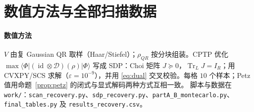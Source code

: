 \documentclass[11pt,a4paper]{ctexart}
\theoremstyle{definition}
\newcommand{\Tr}{\operatorname{Tr}}
\newcommand{\id}{\operatorname{id}}
\begin{document}
\section{数值方法与全部扫描数据}
\label{app:data}
\label{app:code}

\paragraph{数值方法} $V$ 由复 Gaussian QR 取样（Haar/Stiefel）；$\rho_{QR}$ 按分块组装。CPTP 优化 $\max\langle\Phi|(\id\otimes\mathcal D)(\rho)|\Phi\rangle$ 写成 SDP：Choi 矩阵 $J\succeq0$，$\Tr_LJ=I_R$；用 CVXPY/SCS 求解（$\varepsilon=10^{-9}$），并用 \eqref{eq:dual} 交叉校验。每格 $10$ 个样本；Petz 值用命题~\ref{prop:petz} 的闭式与显式解码两种方式互相一致。
脚本与数据在 \texttt{work/}：\texttt{scan\_recovery.py}、\texttt{sdp\_recovery.py}、\texttt{partA\_B\_montecarlo.py}、\texttt{final\_tables.py} 及 \texttt{results\_recovery.csv}。
\end{document}
